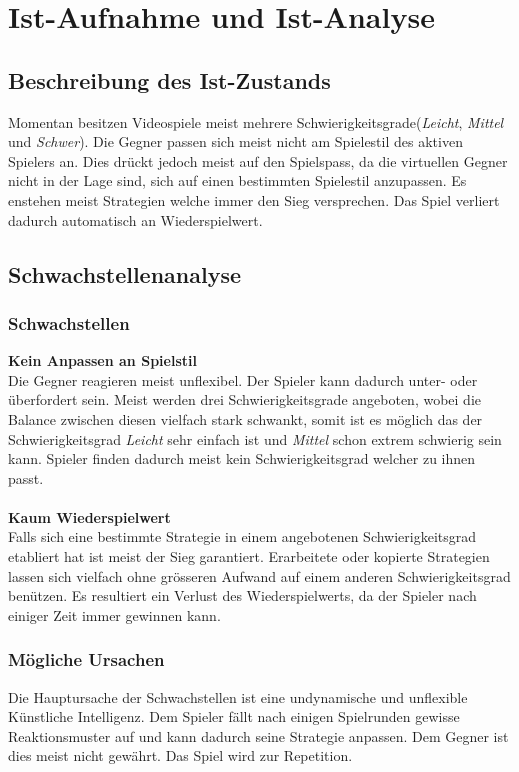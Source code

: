 \section{Ist-Aufnahme und Ist-Analyse}
\subsection{Beschreibung des Ist-Zustands}
Momentan besitzen Videospiele meist mehrere Schwierigkeitsgrade(\emph{Leicht}, \emph{Mittel} und \emph{Schwer}). Die Gegner passen sich meist
nicht am Spielestil des aktiven Spielers an. Dies drückt jedoch meist auf den Spielspass, da die virtuellen Gegner nicht in der 
Lage sind, sich auf einen bestimmten Spielestil anzupassen. Es enstehen meist Strategien welche immer den Sieg versprechen. Das Spiel
verliert dadurch automatisch an Wiederspielwert.
\subsection{Schwachstellenanalyse}
\subsubsection{Schwachstellen}
\textbf{Kein Anpassen an Spielstil}\\
Die Gegner reagieren meist unflexibel. Der Spieler kann dadurch unter- oder überfordert sein. Meist werden drei Schwierigkeitsgrade
angeboten, wobei die Balance zwischen diesen vielfach stark schwankt, somit ist es möglich das der Schwierigkeitsgrad \emph{Leicht} sehr einfach ist und \emph{Mittel} schon extrem schwierig sein kann. Spieler finden dadurch meist kein Schwierigkeitsgrad welcher zu ihnen passt.\\\\
\textbf{Kaum Wiederspielwert}\\
Falls sich eine bestimmte Strategie in einem angebotenen Schwierigkeitsgrad etabliert hat ist meist der Sieg garantiert.
Erarbeitete oder kopierte Strategien lassen sich vielfach ohne grösseren Aufwand auf einem anderen Schwierigkeitsgrad benützen. Es resultiert
ein Verlust des Wiederspielwerts, da der Spieler nach einiger Zeit immer gewinnen kann.
\subsubsection{Mögliche Ursachen}
Die Hauptursache der Schwachstellen ist eine undynamische und unflexible Künstliche Intelligenz. Dem Spieler fällt nach einigen Spielrunden gewisse Reaktionsmuster auf und kann dadurch seine Strategie anpassen. Dem Gegner ist dies meist nicht gewährt. Das Spiel wird zur Repetition.
